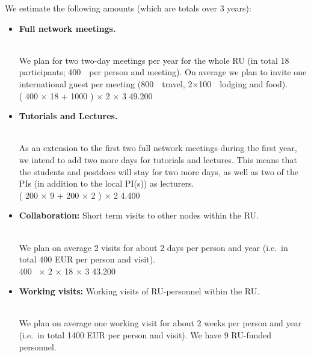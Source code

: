 \documentclass[10pt,fleqn,twoside,a4paper]{article}
\begin{document}
We estimate the following amounts (which are totals over 3 years):


\begin{itemize}
\item
\begin{Emphasize}
{\bf Full network meetings.}
\end{Emphasize}\\
We plan for two two-day meetings per year for the whole RU (in total 18
participants; 400~\EUR{}\ per person and meeting). On average we plan to 
invite one international guest per meeting (800~\EUR{}\ travel, 2$\times$100~\EUR{}\ 
lodging and food).\vspace{0.2em}\\
( 400 \EUR{} $\times$ 18 +  1000 \EUR{} ) $\times$ 2 $\times$ 3  \hfill 49.200~\EUR{}\\
\item
\begin{Emphasize}
{\bf Tutorials and Lectures.}
\end{Emphasize}\\
As an extension to the first two full network meetings during the first year, we
intend to add two more days for tutorials and lectures. This means that the
students and postdocs will stay for two more days, as well as two of the PIs
(in addition to the local PI(s)) as lecturers.
\vspace{0.2em}\\
( 200 \EUR{} $\times$ 9 + 200 \EUR{} $\times$ 2 ) $\times$ 2  \hfill 4.400~\EUR{}\\
\item 
\begin{Emphasize}
{\bf Collaboration:} Short term visits to other nodes within the RU.
\end{Emphasize}\\
We plan on average 2 visits for about 2 days per person and year
(i.e.\ in total 400 EUR per person and visit).
\vspace{0.2em}\\
400~\EUR{} $\times$ 2 $\times$ 18 $\times$ 3    \hfill 43.200~\EUR{}\\
\item 
\begin{Emphasize}
{\bf Working visits:} Working visits of RU-personnel within the RU.
\end{Emphasize}\\
We plan on average one working visit for about 2 weeks per person and year
(i.e.\ in total 1400 EUR per person and visit). We have 9 RU-funded personnel.

\end{itemize}
\end{document}
